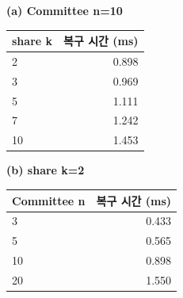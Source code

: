 \par\medskip\noindent
\begin{minipage}[t]{.49\linewidth}\centering
{\small\setlength{\tabcolsep}{7pt}\renewcommand{\arraystretch}{1.12}
\textbf{(a) Committee n=10}\par\smallskip
\begin{tabular}{@{}lr@{}}\toprule
\textbf{share k} & \textbf{복구 시간 (ms)} \\
\midrule
2 & 0.898 \\
3 & 0.969 \\
5 & 1.111 \\
7 & 1.242 \\
10 & 1.453 \\
\bottomrule\end{tabular}}
\end{minipage}\hfill
\begin{minipage}[t]{.49\linewidth}\centering
{\small\setlength{\tabcolsep}{7pt}\renewcommand{\arraystretch}{1.12}
\textbf{(b) share k=2}\par\smallskip
\begin{tabular}{@{}lr@{}}\toprule
\textbf{Committee n} & \textbf{복구 시간 (ms)} \\
\midrule
3 & 0.433 \\
5 & 0.565 \\
10 & 0.898 \\
20 & 1.550 \\
\bottomrule\end{tabular}}
\end{minipage}
\par\medskip
